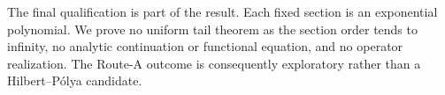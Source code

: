 The final qualification is part of the result.  Each fixed section is an
exponential polynomial.  We prove no uniform tail theorem as the section order
tends to infinity, no analytic continuation or functional equation, and no
operator realization.  The Route-A outcome is consequently exploratory rather
than a Hilbert--P\'olya candidate.

